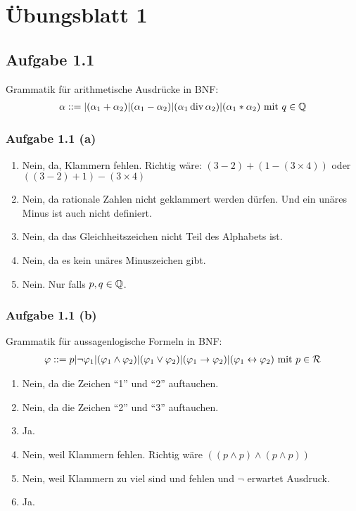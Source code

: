 
\section{Übungsblatt 1}

\subsection{Aufgabe 1.1}
Grammatik für arithmetische Ausdrücke in BNF:
\begin{align*}
	\alpha::=|(\alpha_1+\alpha_2)|(\alpha_1-\alpha_2)|(\alpha_1\div\alpha_2)|(\alpha_1\ast\alpha_2)\mit q\in\Q
\end{align*}

\subsubsection{Aufgabe 1.1 (a)}
\begin{enumerate}[label=(\arabic*)]
	\item Nein, da, Klammern fehlen. Richtig wäre: $(3-2)+(1-(3\times 4))$ oder $((3-2)+1)-(3\times 4)$
	\item Nein, da rationale Zahlen nicht geklammert werden dürfen. Und ein unäres Minus ist auch nicht definiert.
	\item Nein, da das Gleichheitszeichen nicht Teil des Alphabets ist.
	\item Nein, da es kein unäres Minuszeichen gibt.
	\item Nein. Nur falls $p,q\in\Q$.
\end{enumerate}

\subsubsection{Aufgabe 1.1 (b)}
Grammatik für aussagenlogische Formeln in BNF:
\begin{align*}
	\varphi::=p|\neg \varphi_1|(\varphi_1\wedge\varphi_2)|(\varphi_1\vee\varphi_2)|(\varphi_1\to\varphi_2)|(\varphi_1\leftrightarrow\varphi_2)\mit p\in\mathcal{R}
\end{align*}
\begin{enumerate}[label=(\arabic*)]
	\item Nein, da die Zeichen ``1'' und ``2'' auftauchen.
	\item Nein, da die Zeichen ``2'' und ``3'' auftauchen.
	\item Ja.
	\item Nein, weil Klammern fehlen. Richtig wäre $((p\wedge p)\wedge(p\wedge p))$
	\item Nein, weil Klammern zu viel sind und fehlen und $\neg$ erwartet Ausdruck.
	\item Ja.
\end{enumerate}

